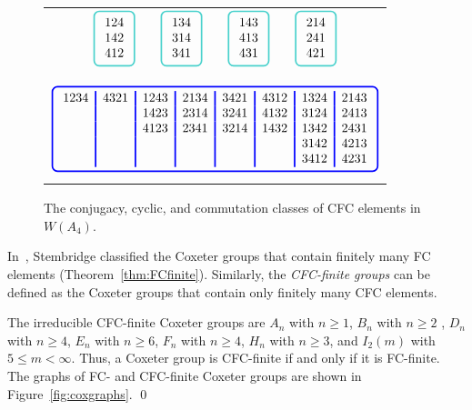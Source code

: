 \begin{example}
\begin{center}
\begin{figure}[ht!]
\begin{tabular}{c}
%
${\ds
\setlength{\arrayrulewidth}{1.25pt}
\begin{array}{ccccccc}
\boxt{\begin{array}{c} 124 \\ 142 \\ 412 \end{array}} &&
\boxt{\begin{array}{c} 134 \\ 314 \\ 341 \end{array}} &&
\boxt{\begin{array}{c} 143 \\ 413 \\ 431 \end{array}} &&
\boxt{\begin{array}{c} 214 \\ 241 \\ 421 \end{array}}
\end{array}}$ \\ \\
%
$$\boxbl{
\setlength{\arrayrulewidth}{1.25pt}
\begin{array}{l|l|l|l|l|l|l|l}\arrayrulecolor{darkblue}
    1234 & 4321 & 1243 & 2134 & 3421 & 4312 & 1324 & 2143 \\
         &      & 1423 & 2314 & 3241 & 4132 & 3124 & 2413 \\
         &      & 4123 & 2341 & 3214 & 1432 & 1342 & 2431 \\
         &      &      &      &      &      & 3142 & 4213 \\
         &      &      &      &      &      & 3412 & 4231
\end{array}}$$
\end{tabular}
\caption{The conjugacy, cyclic, and commutation classes of CFC elements in $W(A_4)$.} \label{fig:A4boxes} 
\end{figure} \end{center}
\end{example}

    In~\cite{Stembridge1996}, Stembridge classified the Coxeter groups that contain finitely many FC elements (Theorem~\ref{thm:FCfinite}). Similarly, the \emph{CFC-finite groups} can be defined as the Coxeter groups that contain only finitely many CFC elements.

\begin{theorem} \label{thm:CFCfinite}
    The irreducible CFC-finite Coxeter groups are $A_n$  with $n\geq 1$, $B_n$ with $n\geq 2$ , $D_n$ with $n\geq 4$, $E_n$ with $n\geq 6$, $F_n$ with $n\geq 4$, $H_n$ with $n\geq 3$, and $I_2(m)$ with $5 \leq m < \infty$. Thus, a Coxeter group is CFC-finite if and only if it is FC-finite. The graphs of FC- and CFC-finite Coxeter groups are shown in Figure~\ref{fig:coxgraphs}. \qed
\end{theorem}

